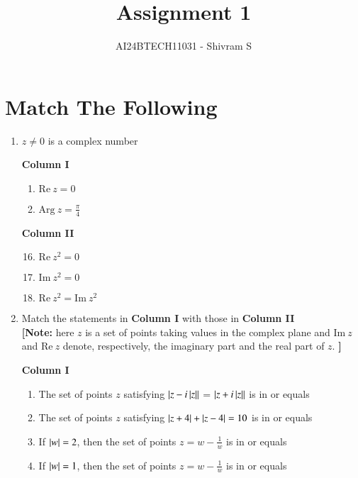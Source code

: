 \documentclass[journal,12pt,twocolumn]{IEEEtran}
\theoremstyle{remark}
\begin{document}


\title{Assignment 1}
\author{AI24BTECH11031 - Shivram S}
\maketitle
\newpage
\bigskip

\renewcommand{\thefigure}{\theenumi}
\renewcommand{\thetable}{\theenumi}
\section{Match The Following}

\begin{enumerate}[label=\arabic*)]
	\item $z \ne 0$ is a complex number
		\hfill {}

		\begin{multicols}{2}
			\textbf{Column I}
			\begin{enumerate}[label=(\Alph*)]
				\item $\mathrm{Re}\ z = 0$
				\item $\mathrm{Arg}\ z = \frac{\pi}{4}$
			\end{enumerate}
			\columnbreak
			\textbf{Column II}
			\begin{enumerate}[label=(\alph*)]
					\setcounter{enumii}{15}
				\item $\mathrm{Re}\ z^2 = 0$
				\item $\mathrm{Im}\ z^2 = 0$
				\item $\mathrm{Re}\ z^2 = \mathrm{Im}\ z^2$
			\end{enumerate}
		\end{multicols}

	\item Match the statements in \textbf{Column I} with those in \textbf{Column II}
		\hfill {} \\
		\textbf{[Note:} here $z$ is a set of points taking values in the
		complex plane and $\mathrm{Im}\ z$ and $\mathrm{Re}\ z$
		denote, respectively, the imaginary part and the real part of $z$. \textbf{]}

		\textbf{Column I}
		\begin{enumerate}[label=(\Alph*)]
			\item The set of points $z$ satisfying $\left\vert z - i\left\vert z\right\vert\right\vert$ = $\left\vert z + i\left\vert z\right\vert\right\vert$ is in or equals
			\item The set of points $z$ satisfying $\left\vert z + 4\right\vert + \left\vert z - 4\right\vert = 10$ is in or equals
			\item If $\left\vert w\right\vert = 2$, then the set of points $z = w - \frac{1}{w}$ is in or equals
			\item If $\left\vert w\right\vert = 1$, then the set of points $z = w - \frac{1}{w}$ is in or equals
		\end{enumerate}


\end{enumerate}
\end{document}
